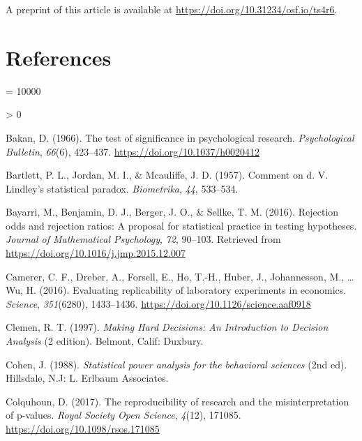 \documentclass[
  english,
  ,man, a4paper,floatsintext]{apa6}
\newlength{\cslhangindent}
\newenvironment{CSLReferences}[2] %
 {%
  \setlength{\parindent}{0pt}
  \ifodd #1 \everypar{\setlength{\hangindent}{\cslhangindent}}\ignorespaces\fi
  \ifnum #2 > 0
  \setlength{\parskip}{#2\baselineskip}
  \fi
 }%
 {}
\begin{document}
A preprint of this article is available at \url{https://doi.org/10.31234/osf.io/ts4r6}.

\newpage

\hypertarget{references}{%
\section{References}\label{references}}

\begingroup

\interlinepenalty = 10000

\hypertarget{refs}{}
\begin{CSLReferences}{1}{0}
\leavevmode\hypertarget{ref-bakan_test_1966}{}%
Bakan, D. (1966). The test of significance in psychological research. \emph{Psychological Bulletin}, \emph{66}(6), 423--437. \url{https://doi.org/10.1037/h0020412}

\leavevmode\hypertarget{ref-bartlett1957comment}{}%
Bartlett, P. L., Jordan, M. I., \& Mcauliffe, J. D. (1957). Comment on d. V. Lindley's statistical paradox. \emph{Biometrika}, \emph{44}, 533--534.

\leavevmode\hypertarget{ref-bayarri2016rejection}{}%
Bayarri, M., Benjamin, D. J., Berger, J. O., \& Sellke, T. M. (2016). Rejection odds and rejection ratios: A proposal for statistical practice in testing hypotheses. \emph{Journal of Mathematical Psychology}, \emph{72}, 90--103. Retrieved from \url{https://doi.org/10.1016/j.jmp.2015.12.007}

\leavevmode\hypertarget{ref-camerer_2016}{}%
Camerer, C. F., Dreber, A., Forsell, E., Ho, T.-H., Huber, J., Johannesson, M., \ldots{} Wu, H. (2016). Evaluating replicability of laboratory experiments in economics. \emph{Science}, \emph{351}(6280), 1433--1436. \url{https://doi.org/10.1126/science.aaf0918}

\leavevmode\hypertarget{ref-clemen_making_1997}{}%
Clemen, R. T. (1997). \emph{Making {Hard} {Decisions}: {An} {Introduction} to {Decision} {Analysis}} (2 edition). Belmont, Calif: Duxbury.

\leavevmode\hypertarget{ref-cohen_statistical_1988}{}%
Cohen, J. (1988). \emph{Statistical power analysis for the behavioral sciences} (2nd ed). {Hillsdale, N.J}: {L. Erlbaum Associates}.

\leavevmode\hypertarget{ref-colquhoun_reproducibility_2017}{}%
Colquhoun, D. (2017). The reproducibility of research and the misinterpretation of p-values. \emph{Royal Society Open Science}, \emph{4}(12), 171085. \url{https://doi.org/10.1098/rsos.171085}


\end{CSLReferences}
\end{document}

